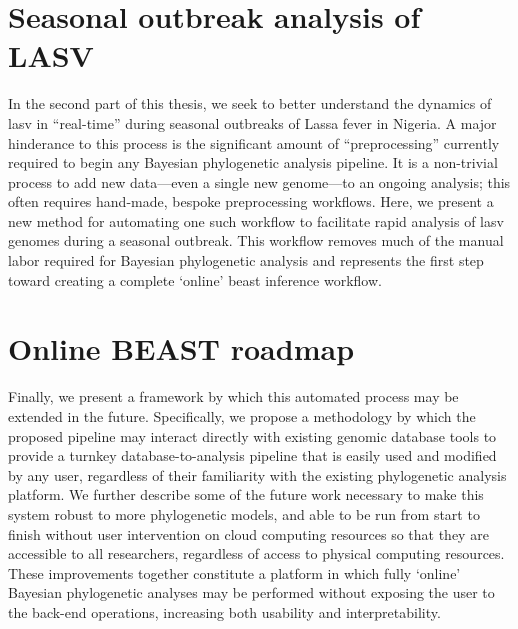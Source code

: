 \section{Seasonal outbreak analysis of LASV}

In the second part of this thesis, we seek to better understand the dynamics of \gls{lasv} in ``real-time'' during seasonal outbreaks of Lassa fever in Nigeria.
A major hinderance to this process is the significant amount of ``preprocessing'' currently required to begin any Bayesian phylogenetic analysis pipeline.
It is a non-trivial process to add new data---even a single new genome---to an ongoing analysis; this often requires hand-made, bespoke preprocessing workflows.
Here, we present a new method for automating one such workflow to facilitate rapid analysis of \gls{lasv} genomes during a seasonal outbreak.
This workflow removes much of the manual labor required for Bayesian phylogenetic analysis and represents the first step toward creating a complete `online' \gls{beast} inference workflow.


\section{Online BEAST roadmap}

Finally, we present a framework by which this automated process may be extended in the future.
Specifically, we propose a methodology by which the proposed pipeline may interact directly with existing genomic database tools to provide a turnkey database-to-analysis pipeline that is easily used and modified by any user, regardless of their familiarity with the existing phylogenetic analysis platform.
We further describe some of the future work necessary to make this system robust to more phylogenetic models, and able to be run from start to finish without user intervention on cloud computing resources so that they are accessible to all researchers, regardless of access to physical computing resources.
These improvements together constitute a platform in which fully `online' Bayesian phylogenetic analyses may be performed without exposing the user to the back-end operations, increasing both usability and interpretability.


\cleardoublepage

